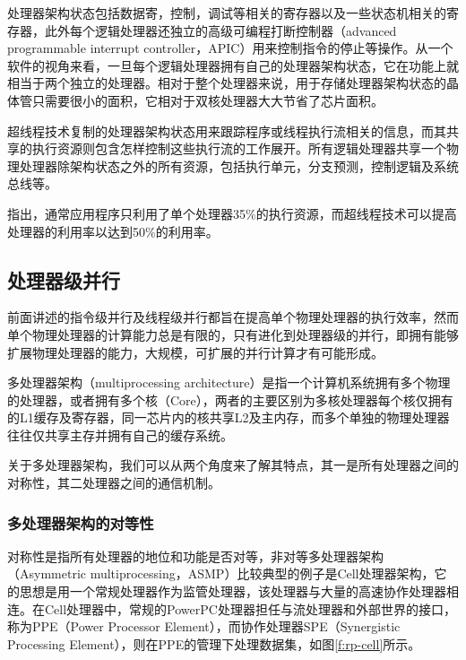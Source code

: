 处理器架构状态包括数据寄，控制，调试等相关的寄存器以及一些状态机相关的寄存器，此外每个逻辑处理器还独立的高级可编程打断控制器（advanced programmable interrupt controller，APIC）用来控制指令的停止等操作。从一个软件的视角来看，一旦每个逻辑处理器拥有自己的处理器架构状态，它在功能上就相当于两个独立的处理器。相对于整个处理器来说，用于存储处理器架构状态的晶体管只需要很小的面积，它相对于双核处理器大大节省了芯片面积。

超线程技术复制的处理器架构状态用来跟踪程序或线程执行流相关的信息，而其共享的执行资源则包含怎样控制这些执行流的工作展开。所有逻辑处理器共享一个物理处理器除架构状态之外的所有资源，包括执行单元，分支预测，控制逻辑及系统总线等。

\cite{a:IntelHyper-ThreadingTechnology}指出，通常应用程序只利用了单个处理器35\%的执行资源，而超线程技术可以提高处理器的利用率以达到50\%的利用率。






\subsection{处理器级并行}
前面讲述的指令级并行及线程级并行都旨在提高单个物理处理器的执行效率，然而单个物理处理器的计算能力总是有限的，只有进化到处理器级的并行，即拥有能够扩展物理处理器的能力，大规模，可扩展的并行计算才有可能形成。

多处理器架构（multiprocessing architecture）是指一个计算机系统拥有多个物理的处理器，或者拥有多个核（Core），两者的主要区别为多核处理器每个核仅拥有的L1缓存及寄存器，同一芯片内的核共享L2及主内存，而多个单独的物理处理器往往仅共享主存并拥有自己的缓存系统。


关于多处理器架构，我们可以从两个角度来了解其特点，其一是所有处理器之间的对称性，其二处理器之间的通信机制。



\subsubsection{多处理器架构的对等性}
对称性是指所有处理器的地位和功能是否对等，非对等多处理器架构（Asymmetric multiprocessing，ASMP）比较典型的例子是Cell处理器架构，它的思想是用一个常规处理器作为监管处理器，该处理器与大量的高速协作处理器相连。在Cell处理器中，常规的PowerPC处理器担任与流处理器和外部世界的接口，称为PPE（Power Processor Element），而协作处理器SPE（Synergistic Processing Element），则在PPE的管理下处理数据集，如图\ref{f:rp-cell}所示。

